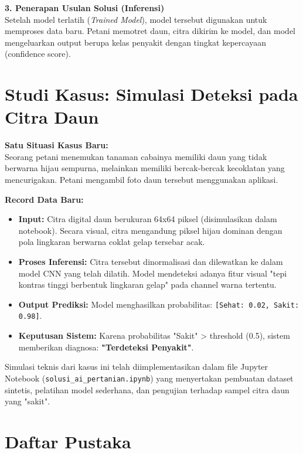 \documentclass[a4paper,12pt]{article}
\begin{document}
\textbf{3. Penerapan Usulan Solusi (Inferensi)} \\
Setelah model terlatih (\textit{Trained Model}), model tersebut digunakan untuk memproses data baru. Petani memotret daun, citra dikirim ke model, dan model mengeluarkan output berupa kelas penyakit dengan tingkat kepercayaan (confidence score).

\section{Studi Kasus: Simulasi Deteksi pada Citra Daun}

\textbf{Satu Situasi Kasus Baru:} \\
Seorang petani menemukan tanaman cabainya memiliki daun yang tidak berwarna hijau sempurna, melainkan memiliki bercak-bercak kecoklatan yang mencurigakan. Petani mengambil foto daun tersebut menggunakan aplikasi.

\textbf{Record Data Baru:}
\begin{itemize}
    \item \textbf{Input:} Citra digital daun berukuran 64x64 piksel (disimulasikan dalam notebook). Secara visual, citra mengandung piksel hijau dominan dengan pola lingkaran berwarna coklat gelap tersebar acak.
    \item \textbf{Proses Inferensi:} Citra tersebut dinormalisasi dan dilewatkan ke dalam model CNN yang telah dilatih. Model mendeteksi adanya fitur visual "tepi kontras tinggi berbentuk lingkaran gelap" pada channel warna tertentu.
    \item \textbf{Output Prediksi:} Model menghasilkan probabilitas: \texttt{[Sehat: 0.02, Sakit: 0.98]}.
    \item \textbf{Keputusan Sistem:} Karena probabilitas "Sakit" > threshold (0.5), sistem memberikan diagnosa: \textbf{"Terdeteksi Penyakit"}.
\end{itemize}

Simulasi teknis dari kasus ini telah diimplementasikan dalam file Jupyter Notebook (\texttt{solusi\_ai\_pertanian.ipynb}) yang menyertakan pembuatan dataset sintetis, pelatihan model sederhana, dan pengujian terhadap sampel citra daun yang "sakit".

\section*{Daftar Pustaka}
\end{document}
